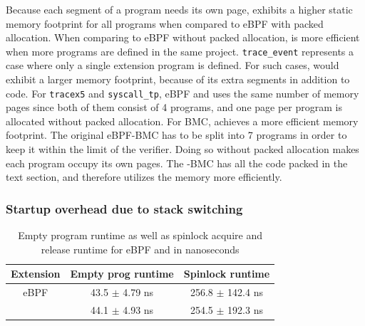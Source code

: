 Because each segment of a \projname{} program needs its own page, \projname{}
    exhibits a higher static memory footprint for all programs when compared to
    eBPF with packed allocation.
When comparing to eBPF without packed allocation, \projname{} is more efficient
    when more programs are defined in the same project.
\texttt{trace\_event} represents a case where only a single extension program
    is defined.
For such cases, \projname{} would exhibit a larger memory footprint, because of
    its extra segments in addition to code.
For \texttt{tracex5} and \texttt{syscall\_tp}, eBPF and \projname{} uses the
    same number of memory pages
    since both of them consist of 4 programs, and one page per program is
    allocated without packed allocation.
For BMC, \projname{} achieves a more efficient memory footprint.
The original eBPF-BMC has to be split into 7 programs in order to keep it
    within the limit of the verifier.
Doing so without packed allocation makes each program occupy its own pages.
The \projname{}-BMC has all the code packed in the text section, and therefore
    utilizes the memory more efficiently.



\subsubsection{Startup overhead due to stack switching}
\begin{table}[t]
    \small
    \centering
    \begin{tabular}{ccc}%
        \toprule
        \textbf{Extension} & \textbf{Empty prog runtime} & \textbf{Spinlock runtime} \\
        \midrule
        eBPF & 43.5 $\pm$ 4.79 ns & 256.8 $\pm$ 142.4 ns\\
        \projname{} & 44.1 $\pm$ 4.93 ns & 254.5 $\pm$ 192.3 ns\\
        \bottomrule
    \end{tabular}
    \caption{Empty program runtime as well as spinlock acquire and release
        runtime for eBPF and \projname{} in nanoseconds}
    \vspace{-25pt}
    \label{tab:startup-cleanup}
\end{table}

